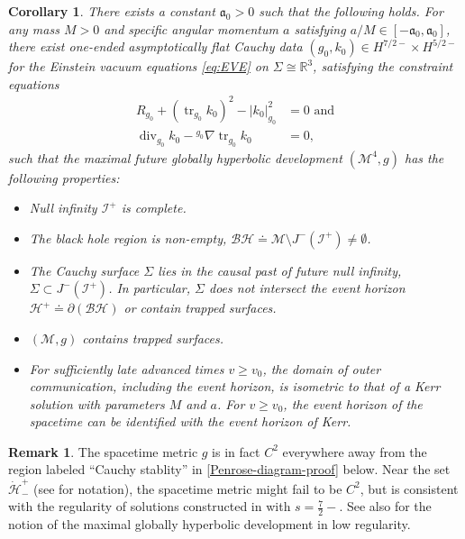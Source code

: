 \documentclass[10pt]{article}
\numberwithin{equation}{section}
\theoremstyle{plain}
\newtheorem{cor}{Corollary}
\theoremstyle{definition}
\newtheorem{rk}{Remark}[section]
\renewcommand{\Bbb}{\mathbb}
\newcommand{\tr}{\operatorname{tr}}
\newcommand{\Div}{\operatorname{div}}
\begin{document}
\setcounter{cor}{0}
\begin{cor}\label{cor:main-2}
There exists a constant $\mathfrak a_0>0$ such that the following holds. For any mass $M>0$ and specific angular momentum $a$ satisfying $a/M\in[-\mathfrak a_0,\mathfrak a_0]$, there exist one-ended asymptotically flat Cauchy data $(g_0,k_0)\in H^{7/2-}\times H^{5/2-}$ for the Einstein vacuum equations \eqref{eq:EVE} on $\Sigma\cong\Bbb R^3$, satisfying the constraint equations
\begin{align}
 \label{eq:Hamiltonian}   R_{g_0} + (\tr_{g_0}k_0)^2 - |k_0|_{g_0}^2 &=0\text{ and}\\
\label{eq:momentum}   \Div_{g_0} k_0- {}^{g_0}\nabla \tr_{g_0}k_0 &=0,
\end{align} 
such that the maximal future globally hyperbolic development $(\mathcal M^4,g)$ has the following properties: 
 \begin{itemize}
     \item Null infinity $\mathcal I^+$ is complete.
     \item The black hole region is non-empty, $\mathcal B\mathcal H\doteq \mathcal M\setminus J^-(\mathcal I^+)\neq \emptyset$.
     \item The Cauchy surface $\Sigma$ lies in the causal past of future null infinity, $\Sigma\subset J^-(\mathcal I^+)$. In particular, $\Sigma$ does not intersect the event horizon $\mathcal H^+\doteq\partial(\mathcal{BH})$ or contain trapped surfaces. 
      \item $(\mathcal M,g)$ contains trapped surfaces. 
     \item For sufficiently late advanced times $v\ge v_0$, the domain of outer communication, including the event horizon, is isometric to that of a Kerr solution with parameters $M$ and $a$. For $v\ge v_0$, the event horizon of the spacetime can be identified with the event horizon of Kerr. 
 \end{itemize}
\end{cor}

\begin{rk}
    The spacetime metric $g$ is in fact $C^2$ everywhere away from the region labeled ``Cauchy stablity'' in \cref{Penrose-diagram-proof} below. Near the set $\dot{\mathcal H}^+_-$ (see \cite[p.~187]{HE73} for notation), the spacetime metric might fail to be $C^2$, but is consistent with the regularity of solutions constructed in \cite{HKM} with $s=\tfrac 72-$. See also \cite{C-low-reg} for the notion of the maximal globally hyperbolic development in low regularity. 
\end{rk}
\end{document}
